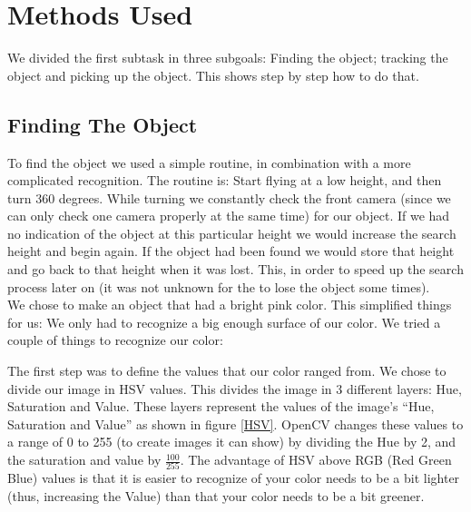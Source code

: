 \section{Methods Used}
We divided the first subtask in three subgoals: Finding the object; tracking the object and picking up the object. This shows step by step how to do that.

\subsection{Finding The Object}
To find the object we used a simple routine, in combination with a more complicated recognition. The routine is: Start flying at a low height, and then turn 360 degrees.
 While turning we constantly check the front camera (since we can only check one camera properly at the same time) for our object. If we had no indication of the object
at this particular height we would increase the search height and begin again. If the object had been found we would store that height and go back to that height when 
it was lost. This, in order to speed up the search process later on (it was not unknown for the \Ardrone to lose the object some times). \\

We chose to make an object that had a bright pink color. This simplified things for us: We only had to recognize a big enough surface of our color. We tried a couple of things to recognize our color:

The first step was to define the values that our color ranged from. We chose to divide our image in HSV values. This divides the image in 3 different layers: Hue, Saturation and Value. These layers represent the values of the image's ``Hue, Saturation and Value'' as shown in figure \ref{HSV}. OpenCV changes these values to a range of 0 to 255 (to create images it can show) by dividing the Hue by 2, and the saturation and value by $\frac{100}{255}$. The advantage of HSV above RGB (Red Green Blue) values is that it is easier to recognize of your color needs to be a bit lighter (thus, increasing the Value) than that your color needs to be a bit greener.

